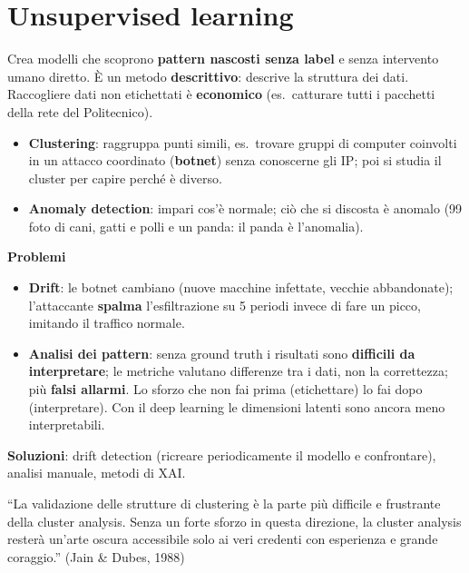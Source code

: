 \section{Unsupervised learning}
\begin{definizione}
Crea modelli che scoprono \textbf{pattern nascosti senza label} e senza intervento umano diretto.
È un metodo \textbf{descrittivo}: descrive la struttura dei dati. Raccogliere dati non etichettati è
\textbf{economico} (es.\ catturare tutti i pacchetti della rete del Politecnico).
\end{definizione}
\begin{itemize}
  \item \textbf{Clustering}: raggruppa punti simili, es.\ trovare gruppi di computer coinvolti in un attacco coordinato
        (\textbf{botnet}) senza conoscerne gli IP; poi si studia il cluster per capire perché è diverso.
  \item \textbf{Anomaly detection}: impari cos'è normale; ciò che si discosta è anomalo (99 foto di cani, gatti e polli
        e un panda: il panda è l'anomalia).
\end{itemize}
\textbf{Problemi}
\begin{itemize}
  \item \textbf{Drift}: le botnet cambiano (nuove macchine infettate, vecchie abbandonate); l'attaccante \textbf{spalma}
        l'esfiltrazione su 5 periodi invece di fare un picco, imitando il traffico normale.
  \item \textbf{Analisi dei pattern}: senza ground truth i risultati sono \textbf{difficili da interpretare}; le metriche
        valutano differenze tra i dati, non la correttezza; più \textbf{falsi allarmi}. Lo sforzo che non fai prima
        (etichettare) lo fai dopo (interpretare). Con il deep learning le dimensioni latenti sono ancora meno interpretabili.
\end{itemize}
\textbf{Soluzioni}: drift detection (ricreare periodicamente il modello e confrontare), analisi manuale, metodi di XAI.

\begin{attenzione}
``La validazione delle strutture di clustering è la parte più difficile e frustrante della cluster analysis.
Senza un forte sforzo in questa direzione, la cluster analysis resterà un'arte oscura accessibile solo ai veri
credenti con esperienza e grande coraggio.'' (Jain \& Dubes, 1988)
\end{attenzione}

